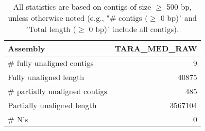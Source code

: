 \documentclass[12pt,a4paper]{article}
\begin{document}
\begin{table}[ht]
\begin{center}
\caption{All statistics are based on contigs of size $\geq$ 500 bp, unless otherwise noted (e.g., "\# contigs ($\geq$ 0 bp)" and "Total length ($\geq$ 0 bp)" include all contigs).}
\begin{tabular}{|l*{1}{|r}|}
\hline
Assembly & TARA\_MED\_RAW \\ \hline
\# fully unaligned contigs & 9 \\ \hline
Fully unaligned length & 40875 \\ \hline
\# partially unaligned contigs & 485 \\ \hline
Partially unaligned length & 3567104 \\ \hline
\# N's & 0 \\ \hline
\end{tabular}
\end{center}
\end{table}
\end{document}
